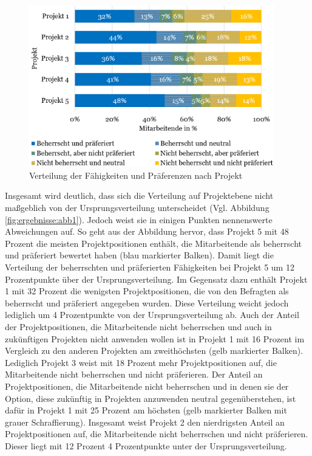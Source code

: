 \begin{figure}
    \centering
	\includegraphics[width=0.95\textwidth]{gfx/verteilung-f-p-nach-projekt.png}
	\caption[Verteilung der Fähigkeiten und Präferenzen nach Projekt]{Verteilung der Fähigkeiten und Präferenzen nach Projekt}
	\label{fig:ergebnisse:abb2}
\end{figure}

Insgesamt wird deutlich, dass sich die Verteilung auf Projektebene nicht maßgeblich von der Ursprungsverteilung unterscheidet (Vgl. Abbildung \ref{fig:ergebnisse:abb1}).
Jedoch weist sie in einigen Punkten nennenswerte Abweichungen auf.
So geht aus der Abbildung hervor, dass Projekt 5 mit 48 Prozent die meisten Projektpositionen enthält, die Mitarbeitende als beherrscht und präferiert bewertet haben (blau markierter Balken).
Damit liegt die Verteilung der beherrschten und präferierten Fähigkeiten bei Projekt 5 um  12 Prozentpunkte über der Ursprungsverteilung.
Im Gegensatz dazu enthält Projekt 1 mit 32 Prozent die wenigsten Projektpositionen, die von den Befragten als beherrscht und präferiert angegeben wurden.
Diese Verteilung weicht jedoch lediglich um 4 Prozentpunkte von der Ursprungsverteilung ab.
Auch der Anteil der Projektpositionen, die Mitarbeitende nicht beherrschen und auch in zukünftigen Projekten nicht anwenden wollen ist in Projekt 1 mit 16 Prozent im Vergleich zu den anderen Projekten am zweithöchsten (gelb markierter Balken).
Lediglich Projekt 3 weist mit 18 Prozent mehr Projektpositionen auf, die Mitarbeitende nicht beherrschen und nicht präferieren.
Der Anteil an Projektpositionen, die Mitarbeitende nicht beherrschen und in denen sie der Option, diese zukünftig in Projekten anzuwenden neutral gegenüberstehen, ist dafür in Projekt 1 mit 25 Prozent am höchsten (gelb markierter Balken mit grauer Schraffierung).
Insgesamt weist Projekt 2 den nierdrigsten Anteil an Projektpositionen auf, die Mitarbeitende nicht beherrschen und nicht präferieren.
Dieser liegt mit 12 Prozent 4 Prozentpunkte unter der Ursprungsverteilung.

